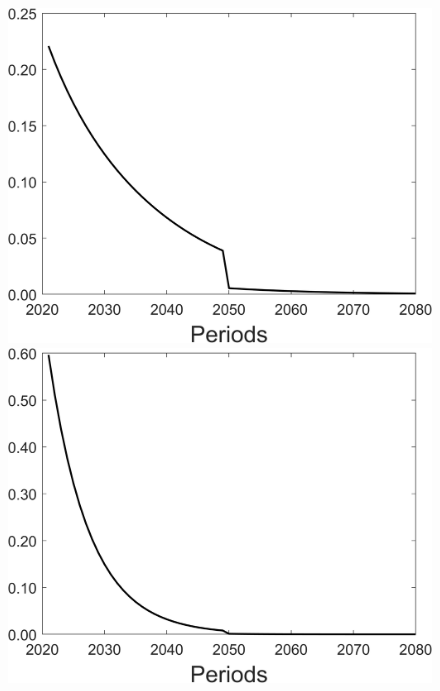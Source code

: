 \begin{figure}[h!!]
\begin{minipage}[]{0.32\textwidth}
	\end{minipage}
	\begin{minipage}[]{0.32\textwidth}
		\includegraphics[width=1\textwidth]{../../codding_model/Own/figures/Rep_agent/staticonlyRam_separate_hl_periods59_eppsilon4.00_zeta1.40_Ad08_Ac04_thetac0.70_thetad0.56_HetGrowth1_tauul0.181_util0_withtarget1_lgd0.png}
	\end{minipage}
	\begin{minipage}[]{0.32\textwidth}
		\includegraphics[width=1\textwidth]{../../codding_model/Own/figures/Rep_agent/staticonlyRam_separate_yc_periods59_eppsilon4.00_zeta1.40_Ad08_Ac04_thetac0.70_thetad0.56_HetGrowth1_tauul0.181_util0_withtarget1_lgd0.png}

\end{minipage}
\end{figure}
